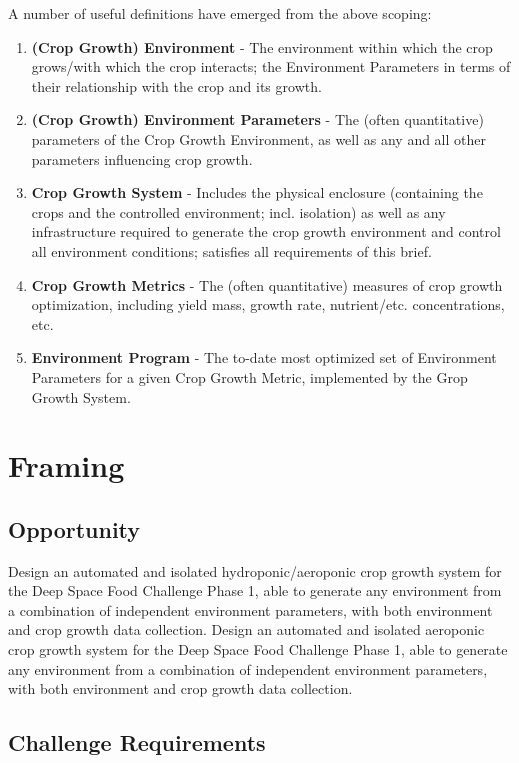 \documentclass{report}
\begin{document}
A number of useful definitions have emerged from the above scoping:
\begin{enumerate}
\item \textbf{(Crop Growth) Environment} - The environment within which the crop grows/with which the crop interacts; the Environment Parameters in terms of their relationship with the crop and its growth.
\item \textbf{(Crop Growth) Environment Parameters} - The (often quantitative) parameters of the Crop Growth Environment, as well as any and all other parameters influencing crop growth.
\item \textbf{Crop Growth System} - Includes the physical enclosure (containing the crops and the controlled environment; incl. isolation) as well as any infrastructure required to generate the crop growth environment and control all environment conditions; satisfies all requirements of this brief.
\item \textbf{Crop Growth Metrics} - The (often quantitative) measures of crop growth optimization, including yield mass, growth rate, nutrient/etc. concentrations, etc.
\item \textbf{Environment Program} - The to-date most optimized set of Environment Parameters for a given Crop Growth Metric, implemented by the Grop Growth System.
\end{enumerate}

\newpage
\section{Framing}
\label{sec:framing}

\subsection{Opportunity}
\label{sec:opportunity}

Design an automated and isolated hydroponic/aeroponic crop growth system for the Deep Space Food Challenge Phase 1\cite{dsfc}, able to generate any environment from a combination of independent environment parameters, with both environment and crop growth data collection.
Design an automated and isolated aeroponic crop growth system for the Deep Space Food Challenge Phase 1\cite{dsfc}, able to generate any environment from a combination of independent environment parameters, with both environment and crop growth data collection.

\subsection{Challenge Requirements}
\label{sec:requirements}
\end{document}

